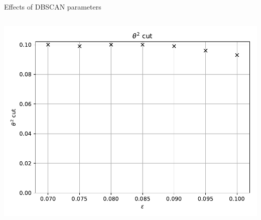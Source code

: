 \begin{frame}{Effects of DBSCAN parameters}
\begin{columns}[onlytextwidth]
\begin{column}{0.33\textwidth}
          \includegraphics[width=\textwidth]{fig/eps_theta_cut.pdf}
      \end{column}
  \end{columns}
\end{frame}

